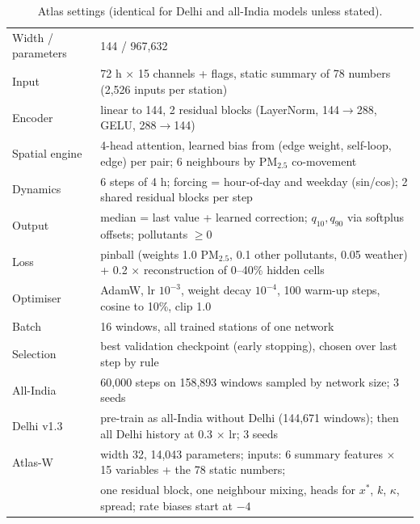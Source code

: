 \documentclass{article}
\newcommand{\pmtf}{PM$_{2.5}$}
\begin{document}
\begin{table}[H]
\caption{Atlas settings (identical for Delhi and all-India models unless stated).}
\centering\small
\begin{tabularx}{\linewidth}{@{}lX@{}}
\toprule
Width / parameters & 144 / 967,632 \\
Input & 72 h $\times$ 15 channels + flags, static summary of 78 numbers (2,526 inputs per station) \\
Encoder & linear to 144, 2 residual blocks (LayerNorm, 144$\to$288, GELU, 288$\to$144) \\
Spatial engine & 4-head attention, learned bias from (edge weight, self-loop, edge) per pair; 6 neighbours by \pmtf{} co-movement \\
Dynamics & 6 steps of 4 h; forcing = hour-of-day and weekday (sin/cos); 2 shared residual blocks per step \\
Output & median = last value + learned correction; $q_{10},q_{90}$ via softplus offsets; pollutants $\geq 0$ \\
Loss & pinball (weights 1.0 \pmtf{}, 0.1 other pollutants, 0.05 weather) + 0.2 $\times$ reconstruction of 0--40\% hidden cells \\
Optimiser & AdamW, lr $10^{-3}$, weight decay $10^{-4}$, 100 warm-up steps, cosine to 10\%, clip 1.0 \\
Batch & 16 windows, all trained stations of one network \\
Selection & best validation checkpoint (early stopping), chosen over last step by rule \\
All-India & 60,000 steps on 158,893 windows sampled by network size; 3 seeds \\
Delhi v1.3 & pre-train as all-India without Delhi (144,671 windows); then all Delhi history at 0.3 $\times$ lr; 3 seeds \\
\midrule
Atlas-W & width 32, 14,043 parameters; inputs: 6 summary features $\times$ 15 variables + the 78 static numbers; \\
 & one residual block, one neighbour mixing, heads for $x^*$, $k$, $\kappa$, spread; rate biases start at $-4$ \\
\bottomrule
\end{tabularx}
\end{table}
\end{document}
